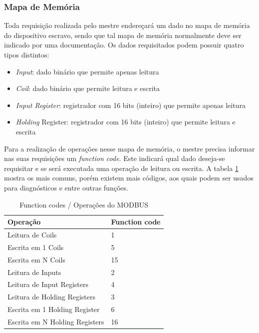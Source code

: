       \subsubsection{Mapa de Memória}
      \label{methodology:tools:modbus:memorymap}

        Toda requisição realizada pelo mestre endereçará um dado no mapa de memória do dispositivo escravo, sendo que tal mapa de memória normalmente deve ser indicado por uma documentação. Os dados requisitados podem possuir quatro tipos distintos:

        \begin{itemize}
          \item \textit{Input}: dado binário que permite apenas leitura
          \item \textit{Coil}: dado binário que permite leitura e escrita
          \item \textit{Input Register}: registrador com 16 bits (inteiro) que permite apenas leitura
          \item \textit{Holding} Register: registrador com 16 bits (inteiro) que permite leitura e escrita
        \end{itemize}

        Para a realização de operações nesse mapa de memória, o mestre precisa informar nas suas requisições um \textit{function code}. Este indicará qual dado deseja-se requisitar e se será executada uma operação de leitura ou escrita. A tabela \ref{table:modbus-funccodes} mostra os mais comuns, porém existem mais códigos, aos quais podem ser usados para diagnósticos e entre outras funções.

        \begin{table}[]
          \centering
          \caption{Function codes / Operações do MODBUS}
          \label{table:modbus-funccodes}
          \begin{tabular}{@{}ll@{}}
            \toprule
            \textbf{Operação}              & \textbf{Function code} \\ \midrule
            Leitura de Coils               & 1                      \\
            Escrita em 1 Coils             & 5                      \\
            Escrita em N Coils             & 15                     \\
            Leitura de Inputs              & 2                      \\
            Leitura de Input Registers     & 4                      \\
            Leitura de Holding Registers   & 3                      \\
            Escrita em 1 Holding Register  & 6                      \\
            Escrita em N Holding Registers & 16                     \\ \bottomrule
          \end{tabular}
        \end{table}

